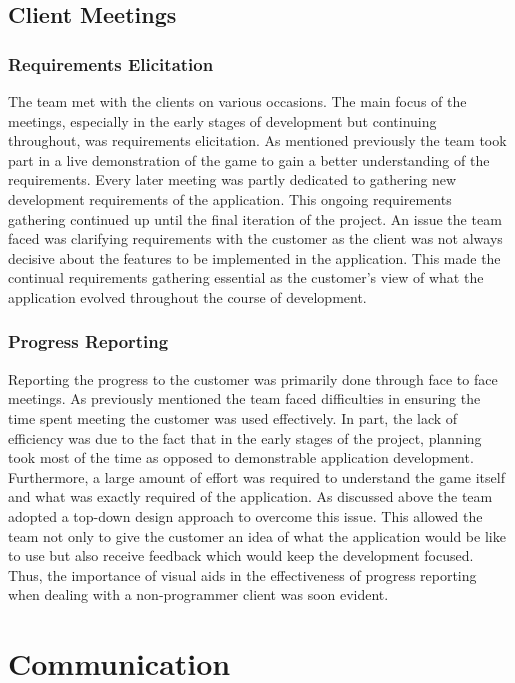 \documentclass{l3proj}
\begin{document}
\subsection{Client Meetings}

\subsubsection{Requirements Elicitation}
The team met with the clients on various occasions. The main focus of the meetings, especially in the early stages of development but continuing throughout, was requirements elicitation. As mentioned previously the team took part in a live demonstration of the game to gain a better understanding of the requirements. Every later meeting was partly dedicated to gathering new development requirements of the application. This ongoing requirements gathering continued up until the final iteration of the project. An issue the team faced was clarifying requirements with the customer as the client was not always decisive about the features to be implemented in the application. This made the continual requirements gathering essential as the customer's view of what the application evolved throughout the course of development.

\subsubsection{Progress Reporting}
Reporting the progress to the customer was primarily done through face to face meetings. As previously mentioned the team faced difficulties in ensuring the time spent meeting the customer was used effectively. In part, the lack of efficiency was due to the fact that in the early stages of the project, planning took most of the time as opposed to demonstrable application development. Furthermore, a large amount of effort was required to understand the game itself and what was exactly required of the application. As discussed above the team adopted a top-down design approach to overcome this issue. This allowed the team not only to give the customer an idea of what the application would be like to use but also receive feedback which would keep the development focused. Thus, the importance of visual aids in the effectiveness of progress reporting when dealing with a non-programmer client was soon evident.

\section{Communication}
\label{sec:communication}
\end{document}
